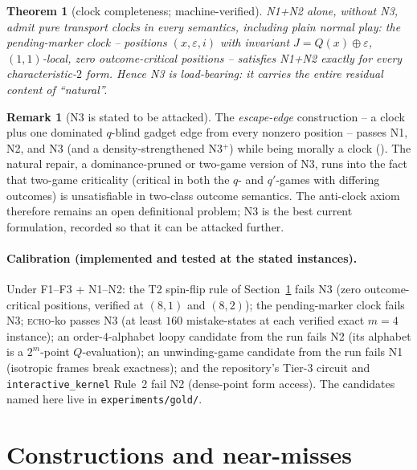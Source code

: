 \documentclass[11pt]{article}
\theoremstyle{plain}
\newtheorem{theorem}{Theorem}
\theoremstyle{definition}
\newtheorem{remark}{Remark}
\begin{document}
\begin{theorem}[clock completeness; machine-verified]\label{thm:clock}
N1+N2 alone, without N3, admit pure transport clocks in every semantics,
including plain normal play: the \emph{pending-marker clock} -- positions
$(x,\varepsilon,i)$ with invariant $J=Q(x)\oplus\varepsilon$, $(1,1)$-local,
zero outcome-critical positions -- satisfies N1+N2 exactly for every
characteristic-$2$ form. Hence N3 is load-bearing: it carries the entire
residual content of ``natural''.
\end{theorem}

\begin{remark}[N3 is stated to be attacked]\label{rem:N3}
The \emph{escape-edge} construction -- a clock plus one dominated $q$-blind
gadget edge from every nonzero position -- passes N1, N2, and N3 (and a
density-strengthened N3$^{+}$) while being morally a clock
(). The natural
repair, a dominance-pruned or two-game version of N3, runs into the fact
that two-game criticality (critical in both the $q$- and $q'$-games with
differing outcomes) is unsatisfiable in two-class outcome semantics. The
anti-clock axiom therefore remains an open definitional problem; N3 is the
best current formulation, recorded so that it can be attacked further.
\end{remark}

\paragraph{Calibration (implemented and tested at the stated instances).}
Under F1--F3 + N1--N2: the T2 spin-flip rule of
Section~\ref{sec:constructions} fails N3 (zero outcome-critical positions,
verified at $(8,1)$ and $(8,2)$); the pending-marker clock fails N3;
\textsc{echo}-ko passes N3 (at least $160$ mistake-states at each verified
exact $m=4$ instance); an order-$4$-alphabet loopy candidate from the run
fails N2 (its alphabet is a $2^m$-point $Q$-evaluation); an
unwinding-game candidate from the run fails N1 (isotropic frames break
exactness); and the repository's Tier-3 circuit and
\texttt{interactive\_kernel} Rule~2 fail N2 (dense-point form access).
The candidates named here live in \texttt{experiments/gold/}.

\section{Constructions and near-misses}\label{sec:constructions}
\end{document}
